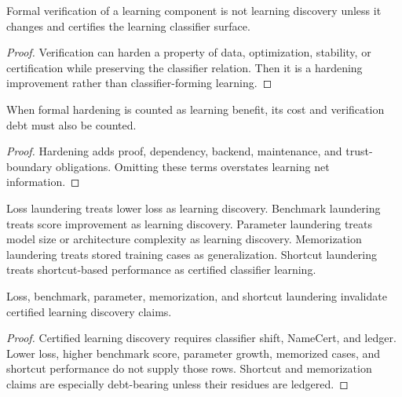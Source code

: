 \begin{theorem}
\label{thm:philosophy-verified-learning-claim-not-learning-discovery}
Formal verification of a learning component is not learning discovery
unless it changes and certifies the learning classifier surface.
\end{theorem}
\begin{proof}
Verification can harden a property of data, optimization, stability, or
certification while preserving the classifier relation. Then it is a
hardening improvement rather than classifier-forming learning.
\end{proof}

\begin{theorem}
\label{thm:philosophy-formal-hardening-cost-enters-learning-information}
When formal hardening is counted as learning benefit, its cost and
verification debt must also be counted.
\end{theorem}
\begin{proof}
Hardening adds proof, dependency, backend, maintenance, and trust-boundary
obligations. Omitting these terms overstates learning net information.
\end{proof}

\begin{definition}
\label{def:philosophy-learning-laundering}
Loss laundering treats lower loss as learning discovery. Benchmark
laundering treats score improvement as learning discovery. Parameter
laundering treats model size or architecture complexity as learning
discovery. Memorization laundering treats stored training cases as
generalization. Shortcut laundering treats shortcut-based performance as
certified classifier learning.
\end{definition}

\begin{theorem}
\label{thm:philosophy-learning-laundering-invalidates-discovery}
Loss, benchmark, parameter, memorization, and shortcut laundering
invalidate certified learning discovery claims.
\end{theorem}
\begin{proof}
Certified learning discovery requires classifier shift, NameCert, and
ledger. Lower loss, higher benchmark score, parameter growth, memorized
cases, and shortcut performance do not supply those rows. Shortcut and
memorization claims are especially debt-bearing unless their residues are
ledgered.
\end{proof}

